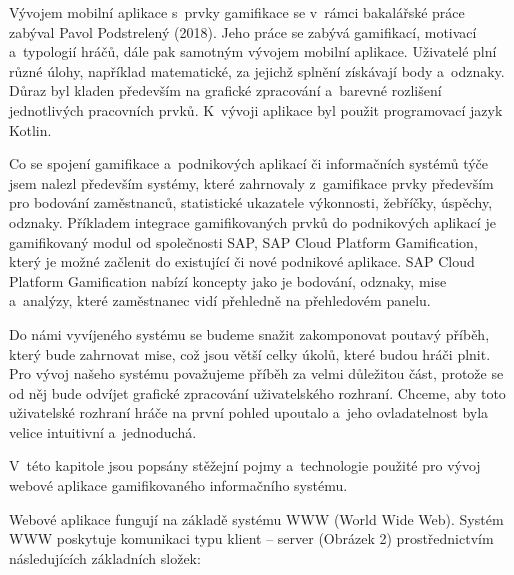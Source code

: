 \documentclass[twoside, 12pt]{article}
\begin{document}
\par

Vývojem mobilní aplikace s~prvky gamifikace se v~rámci bakalářské práce zabýval Pavol Podstrelený (2018).
Jeho práce se zabývá gamifikací, motivací a~typologií hráčů, dále pak samotným vývojem mobilní aplikace.
Uživatelé plní různé úlohy, například matematické, za jejichž splnění získávají body a~odznaky.
Důraz byl kladen především na grafické zpracování a~barevné rozlišení jednotlivých pracovních prvků.
K~vývoji aplikace byl použit programovací jazyk Kotlin.

\par

Co se spojení gamifikace a~podnikových aplikací či informačních systémů týče jsem nalezl především systémy,
které zahrnovaly z~gamifikace prvky především pro bodování zaměstnanců, statistické ukazatele výkonnosti, žebříčky, úspěchy, odznaky.
Příkladem integrace gamifikovaných prvků do podnikových aplikací je gamifikovaný modul od společnosti SAP, SAP Cloud Platform Gamification,
který je možné začlenit do existující či nové podnikové aplikace.
SAP Cloud Platform Gamification nabízí koncepty jako je bodování,
odznaky, mise a~analýzy, které zaměstnanec vidí přehledně na přehledovém panelu.

\par
Do námi vyvíjeného systému se budeme snažit zakomponovat poutavý příběh,
který bude zahrnovat mise, což jsou větší celky úkolů, které budou hráči plnit.
Pro vývoj našeho systému považujeme příběh za velmi důležitou část,
protože se od něj bude odvíjet grafické zpracování uživatelského rozhraní.
Chceme, aby toto uživatelské rozhraní hráče na první pohled upoutalo
a~jeho ovladatelnost byla velice intuitivní a~jednoduchá.

\par


V~této kapitole jsou popsány stěžejní pojmy a~technologie použité pro vývoj webové aplikace
gamifikovaného informačního systému.

Webové aplikace fungují na základě systému WWW (World Wide Web).
Systém WWW  poskytuje komunikaci typu klient -- server (Obrázek 2)
prostřednictvím následujících základních složek:
\end{document}
